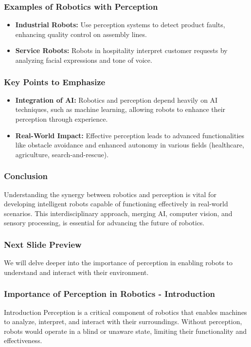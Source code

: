 \documentclass{beamer}
\begin{document}
\begin{frame}[fragile]
    \frametitle{Examples of Robotics with Perception}
    \begin{itemize}
        \item \textbf{Industrial Robots:} 
        Use perception systems to detect product faults, enhancing quality control on assembly lines.
        \item \textbf{Service Robots:} 
        Robots in hospitality interpret customer requests by analyzing facial expressions and tone of voice.
    \end{itemize}
\end{frame}

\begin{frame}[fragile]
    \frametitle{Key Points to Emphasize}
    \begin{itemize}
        \item \textbf{Integration of AI:} 
        Robotics and perception depend heavily on AI techniques, such as machine learning, allowing robots to enhance their perception through experience.
        \item \textbf{Real-World Impact:} 
        Effective perception leads to advanced functionalities like obstacle avoidance and enhanced autonomy in various fields (healthcare, agriculture, search-and-rescue).
    \end{itemize}
\end{frame}

\begin{frame}[fragile]
    \frametitle{Conclusion}
    Understanding the synergy between robotics and perception is vital for developing intelligent robots capable of functioning effectively in real-world scenarios. This interdisciplinary approach, merging AI, computer vision, and sensory processing, is essential for advancing the future of robotics.
\end{frame}

\begin{frame}[fragile]
    \frametitle{Next Slide Preview}
    We will delve deeper into the importance of perception in enabling robots to understand and interact with their environment.
\end{frame}

\begin{frame}[fragile]
    \frametitle{Importance of Perception in Robotics - Introduction}
    \begin{block}{Introduction}
        Perception is a critical component of robotics that enables machines to analyze, interpret, and interact with their surroundings. Without perception, robots would operate in a blind or unaware state, limiting their functionality and effectiveness.
    \end{block}
\end{frame}
\end{document}
